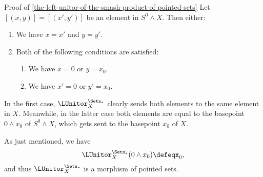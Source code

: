 \begin{Proof}{Proof of \cref{the-left-unitor-of-the-smash-product-of-pointed-sets}}%
    Let $[(x,y)]=[(x',y')]$ be an element in $S^{0}\wedge X$. Then either:
    \begin{enumerate}
        \item\label{proof-of-the-left-unitor-of-the-smash-product-of-pointed-sets-1}We have $x=x'$ and $y=y'$.
        \item\label{proof-of-the-left-unitor-of-the-smash-product-of-pointed-sets-2}Both of the following conditions are satisfied:
            \begin{enumerate}
                \item\label{proof-of-the-left-unitor-of-the-smash-product-of-pointed-sets-2-a}We have $x=0$ or $y=x_{0}$.
                \item\label{proof-of-the-left-unitor-of-the-smash-product-of-pointed-sets-2-b}We have $x'=0$ or $y'=x_{0}$.
            \end{enumerate}
    \end{enumerate}
    In the first case, $\LUnitor^{\Sets_{*}}_{X}$ clearly sends both elements to the same element in $X$. Meanwhile, in the latter case both elements are equal to the basepoint $0\wedge x_{0}$ of $S^{0}\wedge X$, which gets sent to the basepoint $x_{0}$ of $X$.

    As just mentioned, we have
    \[
        \LUnitor^{\Sets_{*}}_{X}(0\wedge x_{0})%
        \defeq%
        x_{0},%
    \]%
    and thus $\LUnitor^{\Sets_{*}}_{X}$ is a morphism of pointed sets.


\end{Proof}
